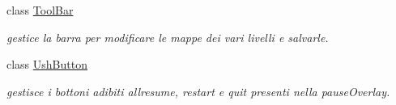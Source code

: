 \begin{DoxyCompactItemize}
class \hyperlink{classui_1_1_tool_bar}{Tool\+Bar}
\begin{DoxyCompactList}\small\item\em gestice la barra per modificare le mappe dei vari livelli e salvarle. \end{DoxyCompactList}\item 
class \hyperlink{classui_1_1_ush_button}{Ush\+Button}
\begin{DoxyCompactList}\small\item\em gestisce i bottoni adibiti all\textquotesingle{}resume, restart e quit presenti nella pause\+Overlay. \end{DoxyCompactList}\end{DoxyCompactItemize}
